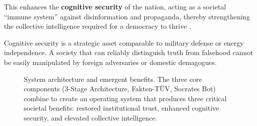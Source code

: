 \documentclass[11pt,a4paper]{article}
\begin{document}
This enhances the \textbf{cognitive security} of the nation, acting as a societal ``immune system'' against disinformation and propaganda, thereby strengthening the collective intelligence required for a democracy to thrive \citep[lines 3453--3454]{AnalyticalReport2025}.

Cognitive security is a strategic asset comparable to military defense or energy independence. A society that can reliably distinguish truth from falsehood cannot be easily manipulated by foreign adversaries or domestic demagogues.


\begin{figure}[h!]
\centering
{}
\caption{System architecture and emergent benefits. The three core components (3-Stage Architecture, Fakten-T\"UV, Socrates Bot) combine to create an operating system that produces three critical societal benefits: restored institutional trust, enhanced cognitive security, and elevated collective intelligence.}
\label{fig:system_architecture}
\end{figure}
\end{document}
